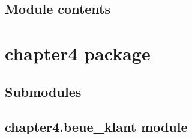 \documentclass[letterpaper,10pt,english]{sphinxmanual}
\begin{document}
\begin{fulllineitems}
\begin{fulllineitems}
\label{\detokenize{chapter3:chapter3.test_ex3.TestIbanValidation.test_valid_iban}}
\pysigstartsignatures
{}
\pysigstopsignatures
\end{fulllineitems}


\begin{fulllineitems}
\label{\detokenize{chapter3:chapter3.test_ex3.TestIbanValidation.test_valid_iban_with_spaces}}
\pysigstartsignatures
{}
\pysigstopsignatures
\end{fulllineitems}


\end{fulllineitems}



\subsection{Module contents}
\label{\detokenize{chapter3:module-chapter3}}\label{\detokenize{chapter3:module-contents}}
\sphinxstepscope


\section{chapter4 package}
\label{\detokenize{chapter4:chapter4-package}}\label{\detokenize{chapter4::doc}}

\subsection{Submodules}
\label{\detokenize{chapter4:submodules}}

\subsection{chapter4.beue\_klant module}
\label{\detokenize{chapter4:module-chapter4.beue_klant}}\label{\detokenize{chapter4:chapter4-beue-klant-module}}
\end{document}
